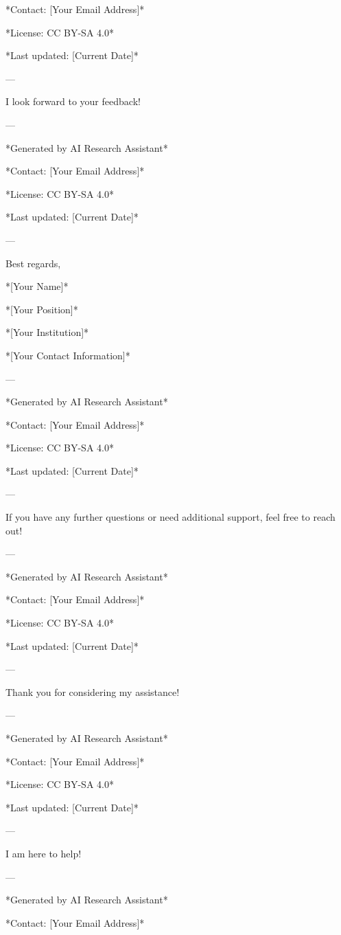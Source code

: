 *Contact: [Your Email Address]* 

*License: CC BY-SA 4.0* 

*Last updated: [Current Date]* 

--- 

I look forward to your feedback! 

--- 

*Generated by AI Research Assistant* 

*Contact: [Your Email Address]* 

*License: CC BY-SA 4.0* 

*Last updated: [Current Date]* 

--- 

Best regards, 

*[Your Name]* 

*[Your Position]* 

*[Your Institution]* 

*[Your Contact Information]* 

--- 

*Generated by AI Research Assistant* 

*Contact: [Your Email Address]* 

*License: CC BY-SA 4.0* 

*Last updated: [Current Date]* 

--- 

If you have any further questions or need additional support, feel free to reach out! 

--- 

*Generated by AI Research Assistant* 

*Contact: [Your Email Address]* 

*License: CC BY-SA 4.0* 

*Last updated: [Current Date]* 

--- 

Thank you for considering my assistance! 

--- 

*Generated by AI Research Assistant* 

*Contact: [Your Email Address]* 

*License: CC BY-SA 4.0* 

*Last updated: [Current Date]* 

--- 

I am here to help! 

--- 

*Generated by AI Research Assistant* 

*Contact: [Your Email Address]* 

